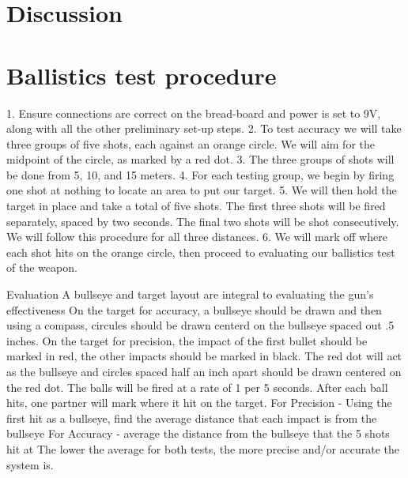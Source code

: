 \documentclass{article}
\begin{document}
\section{Discussion}



%



\appendix
\section{Ballistics test procedure}
\label{app:A}
1. Ensure connections are correct on the bread-board and power is set to 9V, along with all the other preliminary set-up steps.
2. To test accuracy we will take three groups of five shots, each against an orange circle. We will aim for the midpoint of the circle, as marked by a red dot.
3. The three groups of shots will be done from 5, 10, and 15 meters.
4. For each testing group, we begin by firing one shot at nothing to locate an area to put our target.
5. We will then hold the target in place and take a total of five shots. The first three shots will be fired separately, spaced by two seconds. The final two shots will be shot consecutively. We will follow this procedure for all three distances. 
6. We will mark off where each shot hits on the orange circle, then proceed to evaluating our ballistics test of the weapon.
 
Evaluation
A bullseye and target layout are integral to evaluating the gun’s effectiveness
On the target for accuracy, a bullseye should be drawn and then using a compass, circules should be drawn centerd on the bullseye spaced out .5 inches.
On the target for precision, the impact of the first bullet should be marked in red, the other impacts should be marked in black. The red dot will act as the bullseye and circles spaced half an inch apart should be drawn centered on the red dot.
The balls will be fired at a rate of 1 per 5 seconds. After each ball hits, one partner will mark where it hit on the target. 
For Precision - Using the first hit as a bullseye, find the average distance that each impact is from the bullseye
For Accuracy - average the distance from the bullseye that the 5 shots hit at
The lower the average for both tests, the more precise and/or accurate the system is.
\end{document}
